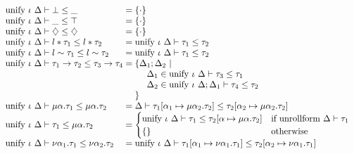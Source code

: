 \documentclass[sigplan,screen]{acmart}
\begin{document}
\begin{figure*}[h]
  \[
    \begin{array}{l @{} l}
      \text{unify } \iota\ \Delta \vdash \bot \leq \_	
      &{} = 
      \{\cdot\}
      \\
      \text{unify } \iota\ \Delta \vdash \_ \leq \top	
      &{} = 
      \{\cdot\}
      \\
      \text{unify } \iota\ \Delta \vdash \diamondsuit \leq \diamondsuit	
      &{} = 
      \{\cdot\}
      \\
      \text{unify } \iota\ \Delta \vdash l*\tau_1 \leq l*\tau_2	
      &{} = 
      \text{unify } \iota\ \Delta \vdash \tau_1 \leq \tau_2
      \\
      \text{unify } \iota\ \Delta \vdash l\sim\tau_1 \leq l\sim\tau_2	
      &{} = 
      \text{unify } \iota\ \Delta \vdash \tau_1 \leq \tau_2
      \\
      \text{unify } \iota\ \Delta \vdash \tau_1\rightarrow\tau_2 \leq \tau_3\rightarrow\tau_4	
      &{} = 
      \begin{array}[t]{@{} l}
        \{\Delta_1;\Delta_2\ |
        \\ 
        \ \ \ \ \Delta_1 \in \text{unify } \iota\ \Delta \vdash \tau_3 \leq \tau_1
        \\
        \ \ \ \ \Delta_2 \in \text{unify } \iota\ \Delta;\Delta_1 \vdash \tau_4 \leq \tau_2
        \\
        \}
      \end{array}
      \\
      \text{unify } \iota\ \Delta \vdash
      \mu \alpha . \tau_1 \leq \mu \alpha . \tau_2
      &{} = 
      \Delta \vdash 
      \tau_1[\alpha_1\mapsto\mu\alpha_2.\tau_2] \leq 
      \tau_2[\alpha_2\mapsto\mu\alpha_2.\tau_2]

      \\
      \text{unify } \iota\ \Delta \vdash
      \tau_1 \leq \mu \alpha . \tau_2
      &{} = 
      \begin{cases}  
        \text{unify } \iota\ \Delta \vdash 
        \tau_1 \leq \tau_2[\alpha\mapsto\mu\alpha.\tau_2]	
        &\text{if }
        \text{unrollform } \Delta \vdash \tau_1
        \\
        \{\}
        &\text{otherwise}
      \end{cases}

      \\
      \text{unify } \iota\ \Delta \vdash
      \nu \alpha_1 . \tau_1 \leq 
      \nu \alpha_2 . \tau_2	
      &{} = 
      \text{unify } \iota\ \Delta \vdash 
      \tau_1[\alpha_1\mapsto\nu\alpha_1.\tau_1] \leq 
      \tau_2[\alpha_2\mapsto\nu\alpha_1.\tau_1]


\end{array}\]
\end{figure*}
\end{document}
